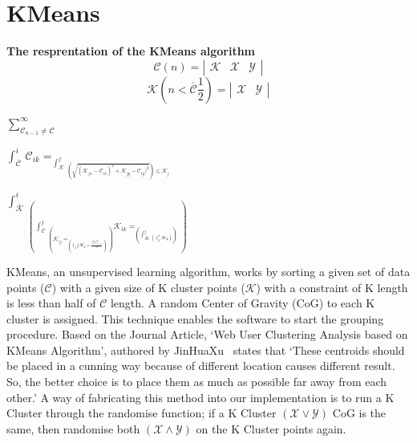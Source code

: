 \documentclass[conference]{IEEEtran}
\begin{document}

    \section{KMeans}
      \begin{center}
        \textbf{The resprentation of the KMeans algorithm}
        \[ \mathcal{C}(n) = \left| 
        \begin{array}{ccc}
          \mathcal{K} & \mathcal{X} & \mathcal{Y}
        \end{array} \right|
        \]
        \[ \mathcal{K}(n \mathcal{<} \overline{\mathcal{C}}\frac{1}{2}) = \left| \begin{array}{cc}
          \mathcal{X} & \mathcal{Y}
          \end{array} \right|
        \] 

        $\sum_{\mathcal{C}_{n-1} \neq \mathcal{C}}^{\infty}$

        $\int_{\overline{\mathcal{C}}}^{i} \, \mathcal{C}_{ik}=
            _{\int_{\overline{\mathcal{K}}}^{j}  \,
              _{\left(\sqrt{(\mathcal{K}_{j x} - \mathcal{C}_{i x})^2 + \mathcal{K}_{j y} - \mathcal{C}_{iy})^2 }
              \right) \leq \mathcal{K}_{j}}}$

        $\int_{\overline{\mathcal{K}}}^{i} \,
        _{\left(\int_{\overline{\mathcal{C}}}^{j} \,
        _{\left(
          \mathcal{K}_{ij} =
         _{\left(\int_{2}{j} \, 
         \overline{\mathcal{M}_k} = \frac{\sum \mathcal{C}_{j \equiv i}^k}{n} 
         \right)}
        \right)}
        \mathcal{K}_{ik} =
        _{\left(\int_{\overline{\mathcal{M}}}^{j} \, 
          _{\left(\int_{2}^{k} \, 
            \mathcal{M}_{jk}
          \right)}
          \right)}
        \right)}$
        
      \end{center}

      KMeans, an unsupervised learning algorithm, works by sorting a given set of data points ($\mathcal{C}$) with a given size of K cluster points ($\mathcal{K}$) with a constraint of K length is less than half of $\mathcal{C}$ length. A random Center of Gravity (CoG) to each K cluster is assigned. This technique enables the software to start the grouping procedure. Based on the Journal Article, `Web User Clustering Analysis based on KMeans Algorithm', authored by JinHuaXu~\cite{jinhuaxu_web_2010} states that `These centroids should be placed in a cunning way because of different location causes different result. So, the better choice is to place them as much as possible far away from each other.' A way of fabricating this method into our implementation is to run a K Cluster through the randomise function; if a K Cluster $(\mathcal{X} \vee \mathcal{Y})$ CoG is the same, then randomise both $(\mathcal{X} \wedge  \mathcal{Y})$ on the K Cluster points again.
\end{document}
